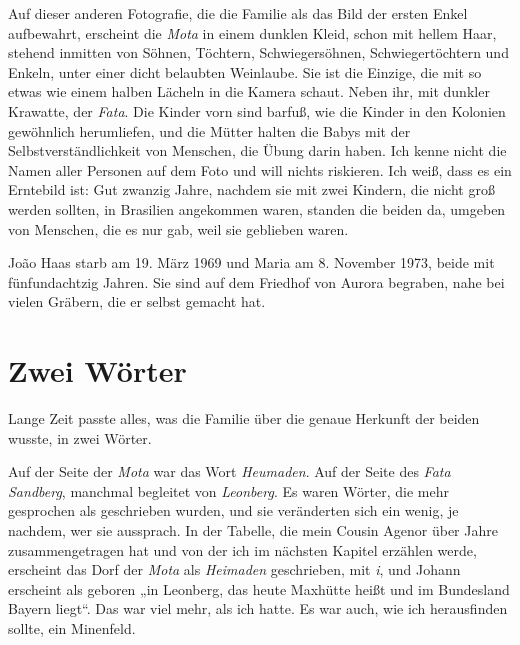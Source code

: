\documentclass[
  ngerman,
  11pt,
  openany]{book}
\begin{document}
Auf dieser anderen Fotografie, die die Familie als das Bild der ersten
Enkel aufbewahrt, erscheint die \emph{Mota} in einem dunklen Kleid,
schon mit hellem Haar, stehend inmitten von Söhnen, Töchtern,
Schwiegersöhnen, Schwiegertöchtern und Enkeln, unter einer dicht
belaubten Weinlaube. Sie ist die Einzige, die mit so etwas wie einem
halben Lächeln in die Kamera schaut. Neben ihr, mit dunkler Krawatte,
der \emph{Fata}. Die Kinder vorn sind barfuß, wie die Kinder in den
Kolonien gewöhnlich herumliefen, und die Mütter halten die Babys mit der
Selbstverständlichkeit von Menschen, die Übung darin haben. Ich kenne
nicht die Namen aller Personen auf dem Foto und will nichts riskieren.
Ich weiß, dass es ein Erntebild ist: Gut zwanzig Jahre, nachdem sie mit
zwei Kindern, die nicht groß werden sollten, in Brasilien angekommen
waren, standen die beiden da, umgeben von Menschen, die es nur gab, weil
sie geblieben waren.

João Haas starb am 19. März 1969 und Maria am 8. November 1973, beide
mit fünfundachtzig Jahren. Sie sind auf dem Friedhof von Aurora
begraben, nahe bei vielen Gräbern, die er selbst gemacht hat.

\section{Zwei Wörter}\label{zwei-wuxf6rter}

Lange Zeit passte alles, was die Familie über die genaue Herkunft der
beiden wusste, in zwei Wörter.

Auf der Seite der \emph{Mota} war das Wort \emph{Heumaden}. Auf der
Seite des \emph{Fata} \emph{Sandberg}, manchmal begleitet von
\emph{Leonberg}. Es waren Wörter, die mehr gesprochen als geschrieben
wurden, und sie veränderten sich ein wenig, je nachdem, wer sie
aussprach. In der Tabelle, die mein Cousin Agenor über Jahre
zusammengetragen hat und von der ich im nächsten Kapitel erzählen werde,
erscheint das Dorf der \emph{Mota} als \emph{Heimaden} geschrieben, mit
\emph{i}, und Johann erscheint als geboren „in Leonberg, das heute
Maxhütte heißt und im Bundesland Bayern liegt``. Das war viel mehr, als
ich hatte. Es war auch, wie ich herausfinden sollte, ein Minenfeld.
\end{document}
